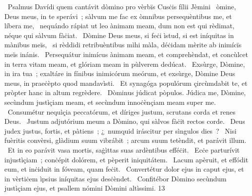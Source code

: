 {~Psalmus Davídi quem cantávit dòmino pro vèrbïs Cusċis fílii Jèmini}
{%
~òmine, Deus meus, in te sperávi~; sàlvum me fac ex òmnibus persequèntibus me, et líbera me,
~nequándo rápiat ut leo ànimam meam, dum non est qui rèdimat, néque qui sàlvum fàċiat.
~Dòmine Deus meus, si feċi ìstud, si est iníquitas in mànibus meïs,
~si rèddidi retribuèntibus mìhi màla, déċidam mèrite ab inimícïs meïs inánis.
~Persequátur inimícus ànimam meam, et comprehèndat, et concùlcet in terra vitam meam, et glóriam meam in pùlverem dedúcat.
~Exsùrge, Dòmine, in ira tua~; exaltáre in fínibus inimicórum meórum, et exsùrge, Dòmine Deus meus, in praeċèpto quod mandavìsti.
~Et synagóga populórum çircùmdabit te, et pròpter hanc in altum regrèdere.
~Dòminus júdicat pòpulos. Júdica me, Dòmine, secùndum justìçiam meam, et secùndum innoċènçiam meam super me.
~Consumétur nequìçia peccatórum, et díriges justum, scrutans corda et renes Deus.
~Justum adjutórium meum a Dòmino, qui sàlvos fàċit rectos corde.
~Deus judex justus, fortis, et pàtiens~; ¿~numquid iráscitur per sìngulos dies~?
~Nisi fuèritis convèrsi, glàdium suum vibrábit~; arcum suum tetèndit, et parávit illum.
~Et in eo parávit vasa mortis, saġìttas suas ardèntibus efféċit.
~Ecċe parturívit injustìçiam~; conċépit dolórem, et pèperit iniquitátem.
~Lacum apèruit, et effódit eum, et inċiduit in fóveam, quam feċit.
~Convertétur dolor ejus in caput ejus, et in vèrtiċem ìpsius iníquitas ejus desċèndet.
~Confitébor Dòmino secùndum justìçiam ejus, et psallem nómini Dòmini altìssimi.}
{1}{3}
